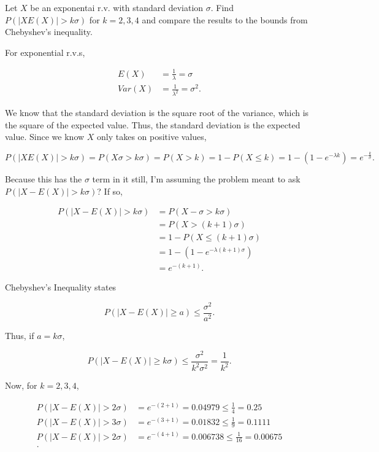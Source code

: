 \documentclass[answers]{exam}
\begin{document}
\begin{questions}
\question[15] Let $X$ be an exponentai r.v. with standard deviation $\sigma$.
Find $P(|XE(X)|>k\sigma)$ for $k=2,3,4$ and compare the results to the bounds
from Chebyshev's inequality.

\begin{solution}
For exponential r.v.s,

\begin{align*}
    E(X) &= \frac{1}{\lambda} = \sigma \\
    Var(X) &= \frac{1}{\lambda^2} = \sigma^2
.\end{align*}

We know that the standard deviation is the square root of the variance, which is
the square of the expected value. Thus, the standard deviation is the expected
value. Since we know $X$ only takes on positive values,

\[
P(|XE(X)| > k\sigma) = P(X\sigma > k\sigma) = P(X > k) = 1 - P(X \le k) = 1 - (1 - e^{-\lambda k})
= e^{-\frac{k}{\sigma}}
.\] 

Because this has the $\sigma$ term in it still, I'm assuming the problem meant
to ask $P(|X - E(X)| > k\sigma)$? If so,

\begin{align*}
P(|X-E(X)| > k\sigma) &= P(X-\sigma > k\sigma) \\
&= P(X > (k+1)\sigma)  \\ 
&= 1 - P(X \le (k+1)\sigma) \\ 
&= 1 - (1 - e^{-\lambda (k+1)\sigma}) \\
&= e^{-(k+1)}
.\end{align*}

Chebyshev's Inequality states

\[
P(|X - E(X)| \ge a) \le \frac{\sigma^2}{a^2}
.\] 

Thus, if $a = k\sigma$,

\[
P(|X - E(X)| \ge k\sigma) \le \frac{\sigma^2}{k^2\sigma^2} = \frac{1}{k^2}
.\] 

Now, for $k=2,3,4$,

\begin{align*}
P(|X - E(X)| > 2\sigma) &= e^{-(2+1)} = 0.04979 \le \frac{1}{4} = 0.25 \\ 
P(|X - E(X)| > 3\sigma) &= e^{-(3+1)} = 0.01832 \le \frac{1}{9} = 0.1111 \\ 
P(|X - E(X)| > 2\sigma) &= e^{-(4+1)} = 0.006738 \le \frac{1}{16} = 0.00675 \\ 
.\end{align*}


\end{solution}
\end{questions}
\end{document}
